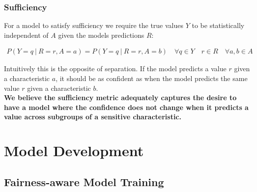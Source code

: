 \documentclass[11pt]{article}
\begin{document}
\subsubsection{Sufficiency}

For a model to satisfy sufficiency we require the true values $Y$ to be statistically independent of $A$ given the models predictions $R$:

\begin{align*}
    P(Y=q\ |\ R=r,A=a)=P(Y=q\ |\ R=r,A=b)\quad \forall q\in Y\quad r\in R\quad \forall a,b\in A
\end{align*}

Intuitively this is the opposite of separation. If the model predicts a value $r$ given a characteristic $a$, it should be as confident as when the model predicts the same value $r$ given a characteristic $b$.\\

\textbf{We believe the sufficiency metric adequately captures the desire to have a model where the confidence does not change when it predicts a value across subgroups of a sensitive characteristic.}

\section{Model Development}





\subsection{Fairness-aware Model Training}
\end{document}
